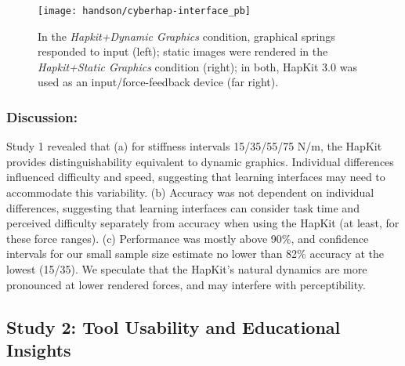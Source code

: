 \begin{figure} [tb]
  \centering
  \texttt{[image: handson/cyberhap-interface\_pb]}
  \caption{In the \textit{Hapkit+Dynamic Graphics} condition, graphical springs responded to input (left); static images were rendered in the \textit{Hapkit+Static Graphics} condition (right); in both, HapKit 3.0\cite{Martinez2016} was used as an input/force-feedback device (far right).}
  \label{fig:study1-hapkit}
\end{figure}

\subsubsection{Discussion:}
Study 1 revealed that (a) for stiffness intervals 15/35/55/75 N/m, the HapKit  provides  distinguishability equivalent to  dynamic graphics.
Individual differences influenced difficulty and speed, 
 suggesting that learning interfaces may need to accommodate this variability. %
(b) Accuracy was not dependent on individual differences, suggesting that learning interfaces can consider task time and perceived difficulty separately from accuracy when using the HapKit (at least, for these force ranges).
(c) Performance was mostly above 90\%, and confidence intervals for our small sample size estimate no lower than 82\% accuracy at the lowest (15/35). 
We speculate that the HapKit's natural dynamics are more pronounced at lower rendered forces, and may interfere with perceptibility. 
%
\subsection{Study 2: Tool Usability and Educational Insights}

%

